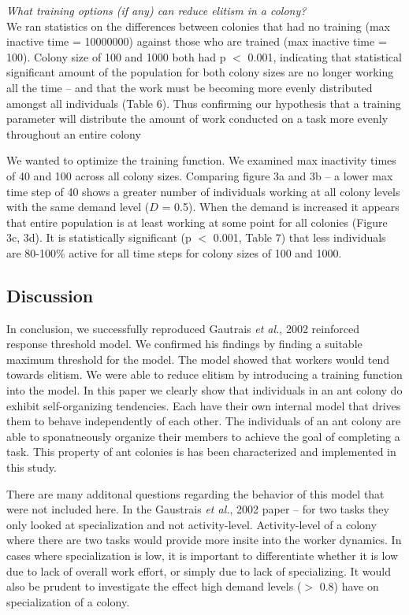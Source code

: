 \documentclass[a4paper]{article}
\begin{document}
\noindent\textit{What training options (if any) can reduce elitism in a colony?}\\
\indent We ran statistics on the differences between colonies that had no training (max inactive time = 10000000) against those who are trained (max inactive time = 100).  Colony size of 100 and 1000 both had p $<$ 0.001, indicating that statistical significant amount of the population for both colony sizes are no longer working all the time – and that the work must be becoming more evenly distributed amongst all individuals (Table 6).  Thus confirming our hypothesis that a training parameter will distribute the amount of work conducted on a task more evenly throughout an entire colony

We wanted to optimize the training function.  We examined max inactivity times of 40 and 100 across all colony sizes.  Comparing figure 3a and 3b – a lower max time step of 40 shows a greater number of individuals working at all colony levels with the same demand level ($D$ = 0.5).  When the demand is increased it appears that entire population is at least working at some point for all colonies (Figure 3c, 3d).  It is statistically significant (p $<$ 0.001, Table 7) that less individuals are 80-100\% active for all time steps for colony sizes of 100 and 1000. 

\subsection{Discussion}
In conclusion, we successfully reproduced Gautrais \textit{et al.}, 2002 reinforced response threshold model.  We confirmed his findings by finding a suitable maximum threshold for the model. The model showed that workers would tend towards elitism. We were able to reduce elitism by introducing a training function into the model. In this paper we clearly show that individuals in an ant colony do exhibit self-organizing tendencies. Each have their own internal model that drives them to behave independently of each other. The individuals of an ant colony are able to sponatneously organize their members to achieve the goal of completing a task. This property of ant colonies is has been characterized and implemented in this study.

There are many additonal questions regarding the behavior of this model that were not included here.  In the Gaustrais \textit{et al.}, 2002 paper -- for two tasks they only looked at specialization and not activity-level. Activity-level of a colony where there are two tasks would provide more insite into the worker dynamics. In cases where specialization is low, it is important to differentiate whether it is low due to lack of overall work effort, or simply due to lack of specializing. It would also be prudent to investigate the effect high demand levels ($>$ 0.8) have on specialization of a colony. 
\end{document}
